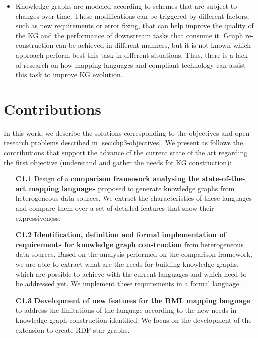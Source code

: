\begin{itemize}
    \item Knowledge graphs are modeled according to schemes that are subject to changes over time. These modifications can be triggered by different factors, such as new requirements or error fixing, that can help improve the quality of the KG and the performance of downstream tasks that consume it. Graph re-construction can be achieved in different manners, but it is not known which approach perform best this task in different situations. Thus, there is a lack of research on how mapping languages and compliant technology can assist this task to improve KG evolution. 
\end{itemize}

\section{Contributions}
\label{sec:chp3-contributions}

In this work, we describe the solutions corresponding to the objectives and open research problems described in \cref{sec:chp3-objectives}. We present as follows the contributions that support the advance of the current state of the art regarding the first objective (understand and gather the needs for KG construction): 

\begin{enumerate}
    \item[\textbf{C1.1}] Design of a \textbf{comparison framework analysing the state-of-the-art mapping languages} proposed to generate knowledge graphs from heterogeneous data sources. We extract the characteristics of these languages and compare them over a set of detailed features that show their expressiveness. 
    
    \item[\textbf{C1.2}] \textbf{Identification, definition and formal implementation of requirements for knowledge graph construction} from heterogeneous data sources. Based on the analysis performed on the comparison framework, we are able to extract what are the needs for building knowledge graphs, which are possible to achieve with the current languages and which need to be addressed yet. We implement these requirements in a formal language. 
    
    \item[\textbf{C1.3}] \textbf{Development of new features for the RML mapping language} to address the limitations of the language according to the new needs in knowledge graph construction identified. We focus on the development of the extension to create RDF-star graphs. 
\end{enumerate}


